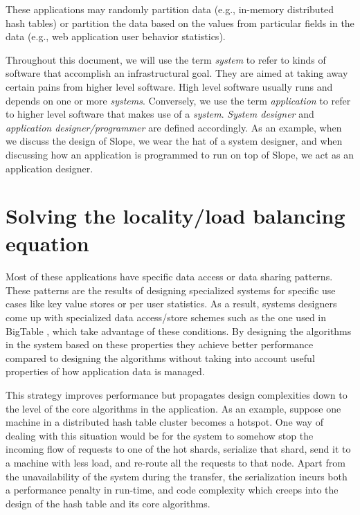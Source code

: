 These applications may randomly partition data (e.g., in-memory distributed
hash tables) or partition the data based on the values from particular fields
in the data (e.g., web application
user behavior statistics).

Throughout this document, we will use the term \emph{system} to refer to
kinds of software that accomplish an infrastructural goal. They are aimed at
taking away certain pains from higher level software. High level software
usually runs and depends on one or more \emph{systems}.
Conversely, we use the term \emph{application} to refer to higher level
software that makes use of a \emph{system}.
\emph{System designer} and \emph{application designer/programmer} are
defined accordingly. As an example, when we
discuss the design of Slope, we wear the hat of a system designer, and when
discussing how an application is programmed to run on top of Slope, we act as
an application designer.


\section{Solving the locality/load balancing equation}
\paragraph{}
Most of these applications have specific data access or data sharing patterns.
These patterns are the results of designing specialized systems for specific
use cases like key value stores or per user statistics.
As a result, systems designers come up with specialized data access/store schemes
such as the one used in BigTable \cite{chang2008bigtable}, which take advantage of these conditions.
By designing the algorithms
in the system based on these properties they achieve better performance compared
to designing the algorithms without taking into account useful properties of
how application data is managed.

This strategy improves performance but propagates design complexities
down to the level of the core algorithms in the application. As an example, suppose
one machine in a distributed hash table cluster becomes a hotspot.
One way of dealing with this situation would be for the system to somehow stop
the incoming flow of requests to one of the hot shards, serialize that shard,
send it to a machine with less load, and re-route all the requests to that node.
Apart from the unavailability of the system during the transfer, the
serialization incurs both a performance penalty in run-time, and code complexity
which creeps into the design of the hash table and its core algorithms.

